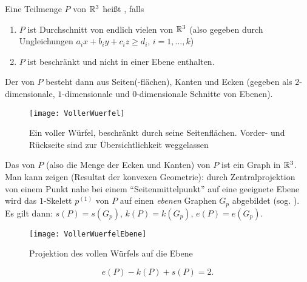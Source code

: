 \begin{definition}[Polyeder]
  Eine Teilmenge \( P \) von \( \mathbb{R}^3 \) heißt \label{def:polyeder}, falls
  \begin{enumerate}
    \item \( P \) ist Durchschnitt von endlich vielen \label{def:affinerHalbraum} von \( \mathbb{R}^3 \) (also gegeben durch Ungleichungen \( {a_i}x+{b_i}y+{c_i}z \geq d_i \), \( i = 1, \dots, k \))
    \item \( P \) ist beschränkt und nicht in einer Ebene enthalten.
  \end{enumerate}

  \begin{minipage}{.45\textwidth}
    Der \label{def:rand} von \( P \) besteht dann aus Seiten(-flächen), Kanten und Ecken (gegeben als \( 2 \)-dimensionale, \( 1 \)-dimensionale und \( 0 \)-dimensionale Schnitte von Ebenen).
  \end{minipage}
  \hfill
  \begin{minipage}{.45\textwidth}
    \begin{figure}[H]
      \texttt{[image: VollerWuerfel]}
      \caption{Ein voller Würfel, beschränkt durch seine Seitenflächen. Vorder- und Rückseite sind zur Übersichtlichkeit weggelassen}
    \end{figure}
  \end{minipage}
\end{definition}

\begin{remark}
  Das \label{def:skelett} von \( P \) (also die Menge der Ecken und Kanten) von \( P \) ist ein Graph in \( \mathbb{R}^3 \). \\
  Man kann zeigen (Resultat der konvexen Geometrie): durch Zentralprojektion von einem Punkt nahe bei einem ``Seitenmittelpunkt'' auf eine geeignete Ebene wird das \( 1 \)-Skelett \( p^{(1)} \) von \( P \) auf einen \emph{ebenen} Graphen \( G_p \) abgebildet (sog. \label{def:schlegelDiagramm}). Es gilt dann: \( s(P) = s(G_p) \), \( k(P) = k(G_p) \), \( e(P) = e(G_p) \).
  \begin{figure}[H]
    \texttt{[image: VollerWuerfelEbene]}
    \caption{Projektion des vollen Würfels auf die Ebene}
  \end{figure}
\end{remark}

\begin{deduction}
  \begin{equation*}
    e(P) - k(P) + s(P) = 2\text{.}
  \end{equation*}
\end{deduction}

